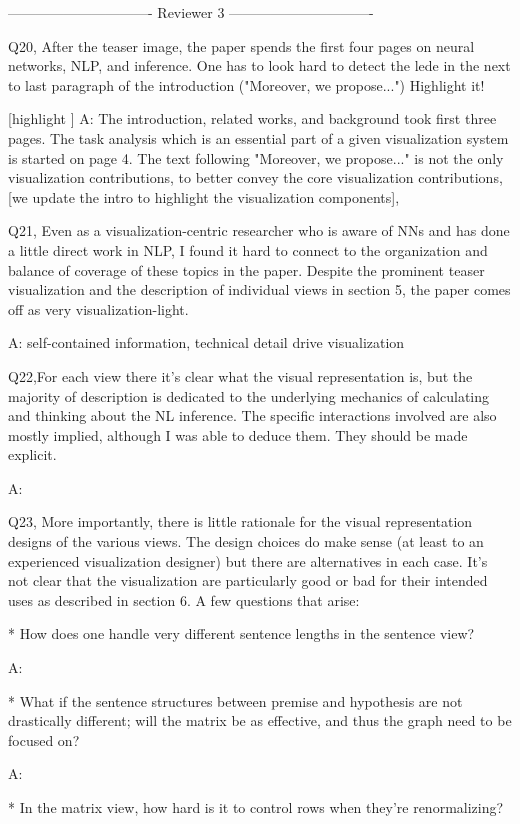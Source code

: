 ------------------------------- Reviewer 3 -------------------------------

Q20, After the teaser image, the paper spends the first four pages on neural networks, NLP, and inference. One has to look hard to detect the lede in the next to last paragraph of the introduction ("Moreover, we propose...") Highlight it!

[highlight ]
A: The introduction, related works, and background took first three pages. The task analysis which is an essential part of a given visualization system is started on page 4. The text following "Moreover, we propose..." is not the only visualization contributions, to better convey the core visualization contributions, [we update the intro to highlight the visualization components],

Q21, Even as a visualization-centric researcher who is aware of NNs and has done a little direct work in NLP, I found it hard to connect to the organization and balance of coverage of these topics in the paper. Despite the prominent teaser visualization and the description of individual views in section 5, the paper comes off as very visualization-light.

A: self-contained information, technical detail drive visualization

Q22,For each view there it's clear what the visual representation is, but the majority of description is dedicated to the underlying mechanics of calculating and thinking about the NL inference. The specific interactions involved are also mostly implied, although I was able to deduce them. They should be made explicit.

A:

Q23, More importantly, there is little rationale for the visual representation designs of the various views. The design choices do make sense (at least to an experienced visualization designer) but there are alternatives in each case. It's not clear that the visualization are particularly good or bad for their intended uses as described in section 6. A few questions that arise:

* How does one handle very different sentence lengths in the sentence view?

A:

* What if the sentence structures between premise and hypothesis are not drastically different; will the matrix be as effective, and thus the graph need to be focused on?

A:

* In the matrix view, how hard is it to control rows when they're renormalizing?

